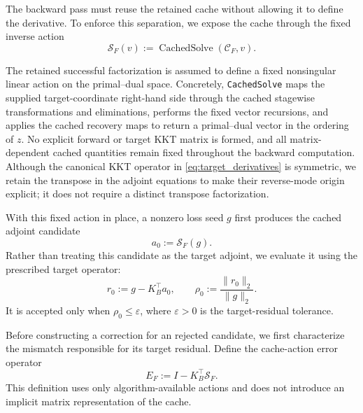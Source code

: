 \documentclass[letterpaper,10pt,conference]{ieeeconf}
\begin{document}
The backward pass must reuse the retained cache without allowing it to
define the derivative. To enforce this separation, we expose the cache
through the fixed inverse action
\begin{equation}
\mathcal S_F(v)
:=
\operatorname{CachedSolve}(\mathcal C_F,v).
\label{eq:cached_solve_action}
\end{equation}

The retained successful factorization is assumed to define a fixed
nonsingular linear action on the primal--dual space. Concretely,
\texttt{CachedSolve} maps the supplied target-coordinate right-hand
side through the cached stagewise transformations and eliminations,
performs the fixed vector recursions, and applies the cached recovery
maps to return a primal--dual vector in the ordering of $z$. No
explicit forward or target KKT matrix is formed, and all
matrix-dependent cached quantities remain fixed throughout the backward computation.
Although the canonical KKT operator in \eqref{eq:target_derivatives} is
symmetric, we retain the transpose in the adjoint equations to make their
reverse-mode origin explicit; it does not require a distinct transpose
factorization.

With this fixed action in place, a nonzero loss seed $g$ first produces
the cached adjoint candidate
\begin{equation}
a_0:=\mathcal S_F(g).
\label{eq:cached_adjoint_candidate}
\end{equation}
Rather than treating this candidate as the target adjoint, we evaluate
it using the prescribed target operator:
\begin{equation}
r_0:=g-K_B^\top a_0,
\qquad
\rho_0:=\frac{\|r_0\|_2}{\|g\|_2}.
\label{eq:initial_target_residual}
\end{equation}
It is accepted only when
$\rho_0\leq\varepsilon$, where $\varepsilon>0$ is the target-residual
tolerance.

Before constructing a correction for an rejected candidate, we first
characterize the mismatch responsible for its target residual. Define
the cache-action error operator
\begin{equation}
E_F:=I-K_B^\top\mathcal S_F.
\label{eq:normalized_mismatch_operator}
\end{equation}
This definition uses only algorithm-available actions and does not
introduce an implicit matrix representation of the cache.
\end{document}
